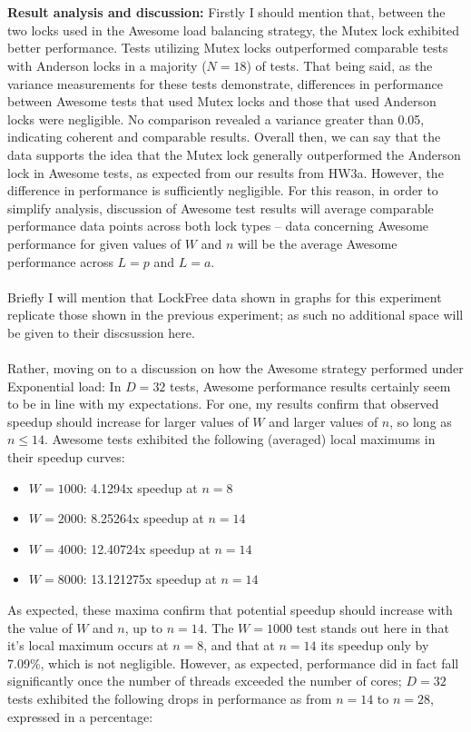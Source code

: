\documentclass[]{article}
\begin{document}
\\\\
\textbf{Result analysis and discussion:}
Firstly I should mention that, between the two locks used in the Awesome load balancing strategy, the Mutex lock exhibited better performance. Tests utilizing Mutex locks outperformed comparable tests with Anderson locks in a majority ($N = 18$) of tests. That being said, as the variance measurements for these tests demonstrate, differences in performance between Awesome tests that used Mutex locks and those that used Anderson locks were negligible. No comparison revealed a variance greater than 0.05, indicating coherent and comparable results. Overall then, we can say that the data supports the idea that the Mutex lock generally outperformed the Anderson lock in Awesome tests, as expected from our results from HW3a. However, the difference in performance is sufficiently negligible. For this reason, in order to simplify analysis, discussion of Awesome test results will average comparable performance data points across both lock types -- data concerning Awesome performance for given values of $W$ and $n$ will be the average Awesome performance across $L = p$ and $L = a$.
\\\\
Briefly I will mention that LockFree data shown in graphs for this experiment replicate those shown in the previous experiment; as such no additional space will be given to their discsussion here.
\\\\
Rather, moving on to a discussion on how the Awesome strategy performed under Exponential load: In $D = 32$ tests, Awesome performance results certainly seem to be in line with my expectations. For one, my results confirm that observed speedup should increase for larger values of $W$ and larger values of $n$, so long as $n \leq 14$. Awesome tests exhibited the following (averaged) local maximums in their speedup curves:
\begin{itemize}
	\item$W = 1000$: 4.1294x speedup at $n = 8$
	\item$W = 2000$: 8.25264x speedup at $n = 14$
	\item$W = 4000$: 12.40724x speedup at $n = 14$
	\item$W = 8000$: 13.121275x speedup at $n = 14$
\end{itemize}
As expected, these maxima confirm that potential speedup should increase with the value of $W$ and $n$, up to $n = 14$. The $W = 1000$ test stands out here in that it's local maximum occurs at $n = 8$, and that at $n = 14$ its speedup only by 7.09\%, which is not negligible. However, as expected, performance did in fact fall significantly once the number of threads exceeded the number of cores; $D = 32$ tests exhibited the following drops in performance as from $n = 14$ to $n = 28$, expressed in a percentage:
\end{document}
